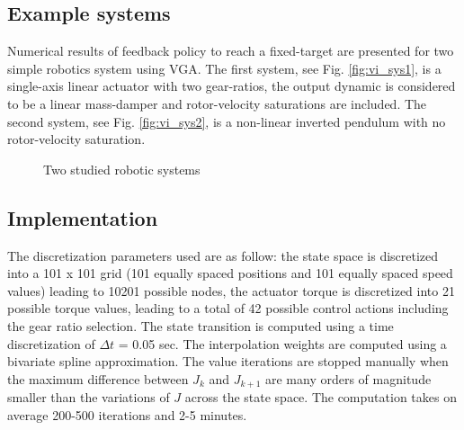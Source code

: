 \subsection{Example systems}

Numerical results of feedback policy to reach a fixed-target are presented for two simple robotics system using VGA. The first system, see Fig. \ref{fig:vi_sys1}, is a single-axis linear actuator with two gear-ratios, the output dynamic is considered to be a linear mass-damper and rotor-velocity saturations are included. The second system, see Fig. \ref{fig:vi_sys2}, is a non-linear inverted pendulum with no rotor-velocity saturation. 
%
\begin{figure}[htp]
        \centering
				\hspace{+5pt}
       \caption{Two studied robotic systems}
			\label{fig:studiedsys}
\end{figure}
%

\subsection{Implementation}
\label{sec:Methodology}

The discretization parameters used are as follow: the state space is discretized into a 101 x 101 grid (101 equally spaced positions and 101 equally spaced speed values) leading to 10201 possible nodes, the actuator torque is discretized into 21 possible torque values, leading to a total of 42 possible control actions including the gear ratio selection. The state transition is computed using a time discretization of $\Delta t$ = 0.05 sec. The interpolation weights are computed using a bivariate spline approximation. The value iterations are stopped manually when the maximum difference between $J_k$ and $J_{k+1}$ are many orders of magnitude smaller than the variations of $J$ across the state space. The computation takes on average 200-500 iterations and 2-5 minutes.

